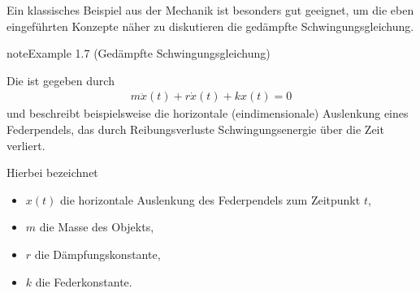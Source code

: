 \documentclass[letterpaper,10pt,german]{jupyterBook}
\begin{document}
\sphinxAtStartPar
Ein klassisches Beispiel aus der Mechanik ist besonders gut geeignet, um die eben eingeführten Konzepte näher zu diskutieren \sphinxhyphen{} die gedämpfte Schwingungsgleichung.
\label{ode/fluesse:ex:oscillations}
\begin{sphinxadmonition}{note}{Example 1.7 (Gedämpfte Schwingungsgleichung)}



\sphinxAtStartPar
Die  ist gegeben durch
\begin{equation}\label{equation:ode/fluesse:eq:schwingungsgleichung}
\begin{split}m\ddot{x}(t) + r\dot{x}(t) + kx(t)=0\end{split}
\end{equation}
\sphinxAtStartPar
und beschreibt beispielsweise die horizontale (eindimensionale) Auslenkung eines Federpendels, das durch Reibungsverluste Schwingungsenergie über die Zeit verliert.

\sphinxAtStartPar
Hierbei bezeichnet
\begin{itemize}
\item {} 
\sphinxAtStartPar
\(x(t)\) die horizontale Auslenkung des Federpendels zum Zeitpunkt \(t\),

\item {} 
\sphinxAtStartPar
\(m\) die Masse des Objekts,

\item {} 
\sphinxAtStartPar
\(r\) die Dämpfungskonstante,

\item {} 
\sphinxAtStartPar
\(k\) die Federkonstante.

\end{itemize}


\end{sphinxadmonition}
\end{document}
